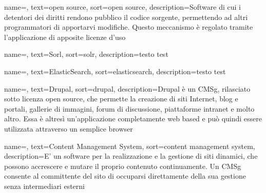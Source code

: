 \renewcommand{\acronymname}{Acronimi e abbreviazioni}


{
	name=,
	text=open source,
	sort=open source,
	description={Software di cui i detentori dei diritti rendono pubblico il codice sorgente, permettendo ad altri 		programmatori di apportarvi modifiche. Questo meccanismo è regolato tramite l’applicazione di apposite licenze d’uso}
}

{
	name=,
	text=Sorl,
	sort=solr,
	description={testo test}
}

{
	name=,
	text=ElasticSearch,
	sort=elasticsearch,
	description={testo test}
}

{
	name=,
	text=Drupal,
	sort=drupal,
	description={Drupal è un \gls{CMSg}, rilasciato sotto licenza \gls{open source}, che permette la creazione di siti Internet, blog e portali, gallerie di immagini, forum di discussione, piattaforme intranet e molto altro. Essa è altresì un’applicazione completamente web based e può quindi essere utilizzata attraverso un semplice browser}
}

{
	name=,
	text=Content Management System,
	sort=content management system,
	description={E’ un software per la realizzazione e la gestione di siti dinamici, che possono accrescere e mutare il proprio contenuto continuamente. Un \gls{CMSg} consente al committente del sito di occuparsi direttamente della sua gestione senza intermediari esterni}
}